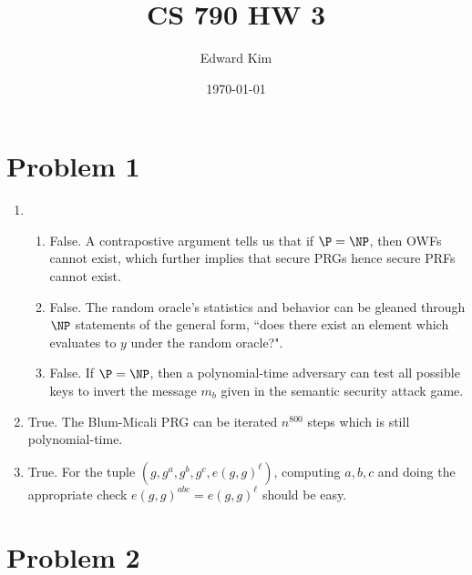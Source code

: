\documentclass[12pt]{article}%
\begin{document}
\title{CS 790 HW 3}
\author{Edward Kim}
\date{\today}
\maketitle

\section*{Problem 1}

\begin{enumerate}
\item
  \begin{enumerate}
    \item False. A contrapostive argument tells us that if $\P = \NP$, then OWFs cannot exist, which further implies that secure PRGs hence secure PRFs cannot exist.
    \item False. The random oracle's statistics and behavior can be gleaned through $\NP$ statements of the general form, ``does there exist an element which evaluates to $y$ under the random oracle?".
    \item False. If $\P = \NP$, then a polynomial-time adversary can test all possible keys to invert the message $m_b$ given in the semantic security attack game.
  \end{enumerate}
\item
  True. The Blum-Micali PRG can be iterated $n^{800}$ steps which is still polynomial-time.
\item
  True. For the tuple $(g,g^a, g^b, g^c, e(g,g)^{\ell})$, computing $a,b,c$ and doing the appropriate check $e(g,g)^{abc} = e(g,g)^{\ell}$ should be easy.
\end{enumerate}

\section*{Problem 2}
\end{document}
